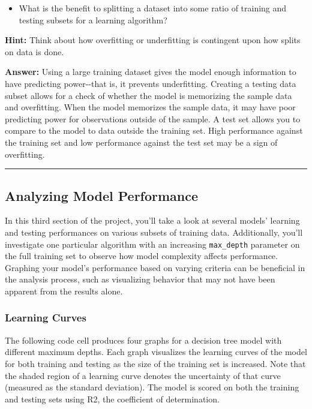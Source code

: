 \documentclass[11pt]{article}
\providecommand{\tightlist}{%
      \setlength{\itemsep}{0pt}\setlength{\parskip}{0pt}}
\begin{document}
\begin{itemize}
\tightlist
\item
  What is the benefit to splitting a dataset into some ratio of training
  and testing subsets for a learning algorithm?
\end{itemize}

\textbf{Hint:} Think about how overfitting or underfitting is contingent
upon how splits on data is done.

    \textbf{Answer: } Using a large training dataset gives the model enough
information to have predicting power-\/-that is, it prevents
underfitting. Creating a testing data subset allows for a check of
whether the model is memorizing the sample data and overfitting. When
the model memorizes the sample data, it may have poor predicting power
for observations outside of the sample. A test set allows you to compare
to the model to data outside the training set. High performance against
the training set and low performance against the test set may be a sign
of overfitting.

    \begin{center}\rule{0.5\linewidth}{\linethickness}\end{center}

\subsection{Analyzing Model
Performance}\label{analyzing-model-performance}

In this third section of the project, you'll take a look at several
models' learning and testing performances on various subsets of training
data. Additionally, you'll investigate one particular algorithm with an
increasing \texttt{\textquotesingle{}max\_depth\textquotesingle{}}
parameter on the full training set to observe how model complexity
affects performance. Graphing your model's performance based on varying
criteria can be beneficial in the analysis process, such as visualizing
behavior that may not have been apparent from the results alone.

    \subsubsection{Learning Curves}\label{learning-curves}

The following code cell produces four graphs for a decision tree model
with different maximum depths. Each graph visualizes the learning curves
of the model for both training and testing as the size of the training
set is increased. Note that the shaded region of a learning curve
denotes the uncertainty of that curve (measured as the standard
deviation). The model is scored on both the training and testing sets
using R2, the coefficient of determination.
\end{document}
